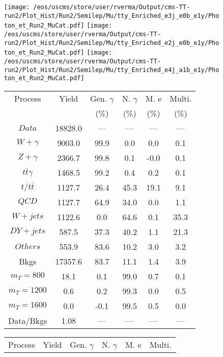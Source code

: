 \begin{figure}
\centering
\texttt{[image: /eos/uscms/store/user/rverma/Output/cms-TT-run2/Plot\_Hist/Run2/Semilep/Mu/tty\_Enriched\_e3j\_e0b\_e1y/Photon\_et\_Run2\_MuCat.pdf]}
\texttt{[image: /eos/uscms/store/user/rverma/Output/cms-TT-run2/Plot\_Hist/Run2/Semilep/Mu/tty\_Enriched\_e2j\_e0b\_e1y/Photon\_et\_Run2\_MuCat.pdf]}
\texttt{[image: /eos/uscms/store/user/rverma/Output/cms-TT-run2/Plot\_Hist/Run2/Semilep/Mu/tty\_Enriched\_e4j\_a1b\_e1y/Photon\_et\_Run2\_MuCat.pdf]}
\begin{minipage}[c]{0.32\textwidth}
\centering
\tiny{
\begin{tabular}{cccccc}
\hline
Process & Yield & Gen. $\gamma$ & N. $\gamma$ & M. e & Multi. \\
 &  & (\%) & (\%) & (\%) & (\%)  \\
\hline
                                                                      $ Data $ &  18828.0 &  --- &  --- &  --- &  ---\\
$ W+\gamma $ &  9003.0 &  99.9 &  0.0 &  0.0 &  0.1\\
$ Z+\gamma $ &  2366.7 &  99.8 &  0.1 &  -0.0 &  0.1\\
$ t\bar{t}\gamma $ &  1468.5 &  99.2 &  0.4 &  0.2 &  0.1\\
$ t/t\bar{t} $ &  1127.7 &  26.4 &  45.3 &  19.1 &  9.1\\
$ QCD $ &  1127.7 &  64.9 &  34.0 &  0.0 &  1.1\\
$ W+jets $ &  1122.6 &  0.0 &  64.6 &  0.1 &  35.3\\
$ DY+jets $ &  587.5 &  37.3 &  40.2 &  1.1 &  21.3\\
$ Others $ &  553.9 &  83.6 &  10.2 &  3.0 &  3.2\\
Bkgs &  17357.6 &  83.7 &  11.1 &  1.4 &  3.9\\
$ m_{T} = 800 $ &  18.1 &  0.1 &  99.0 &  0.7 &  0.1\\
$ m_{T} = 1200 $ &  0.6 &  0.2 &  99.3 &  0.0 &  0.5\\
$ m_{T} = 1600 $ &  0.0 &  -0.1 &  99.5 &  0.5 &  0.0\\
Data/Bkgs &  1.08 &  --- &  --- &  --- &  ---\\
\hline
\end{tabular}
}
\end{minipage}
\begin{minipage}[c]{0.32\textwidth}
\centering
\tiny{
\begin{tabular}{cccccc}
\hline
Process & Yield & Gen. $\gamma$ & N. $\gamma$ & M. e & Multi. \\

\end{tabular}}
\end{minipage}
\end{figure}
